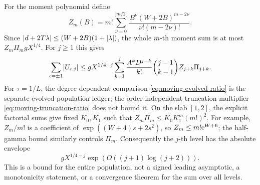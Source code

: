 For the moment polynomial define
\[
 Z_m(B)=m!\sum_{\nu=0}^{\lfloor m/2\rfloor}
       \frac{B^\nu(W+2B)^{m-2\nu}}{\nu!(m-2\nu)!}.
\]
Since \(\lvert d+2T\lambda\rvert\le(W+2B)(1+\lvert \lambda\rvert)\),
the whole \(m\)-th moment sum is at most
\(Z_m\Pi_m gX^{1/4}\).
For \(j\ge1\) this gives
\begin{equation}
 \sum_{\epsilon=\pm1}\lvert U_{\epsilon,j}\rvert
 \le gX^{1/4-j}
       \sum_{k=1}^j\frac{A^kD^{j-k}}{k!}\binom{j-1}{k-1}
                                   Z_{j+k}\Pi_{j+k}.
 \label{eq:level-size}
\end{equation}
For \(\tau=1/L\), the degree-dependent comparison
\eqref{eq:moving-evolved-ratio} is the separate evolved-population
ledger; the order-independent truncation multiplier
\eqref{eq:moving-truncation-ratio} does not bound it.
On the slab \([1,2]\), the explicit factorial sums give fixed
\(K_0,K_1\) such that \(Z_m\Pi_m\le K_0K_1^m(m!)^2\).
For example, \(Z_m/m!\) is a coefficient of
\(\exp((W+4)s+2s^2)\), so \(Z_m\le m!\mathrm e^{W+6}\);
the half-gamma bound similarly controls \(\Pi_m\).
Consequently the \(j\)-th level has the absolute envelope
\[
 gX^{1/4-j}\exp(O((j+1)\log(j+2))).
\]
This is a bound for the entire population, not a signed leading
asymptotic, a monotonicity statement, or a convergence theorem
for the sum over all levels.

